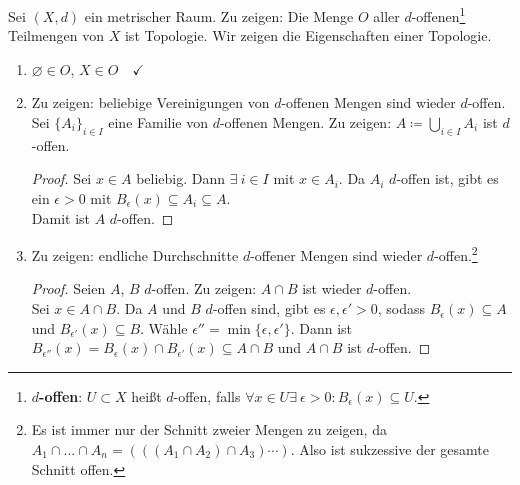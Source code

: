 \begin{problem}[1]
  Sei \( (X, d) \) ein metrischer Raum. Zu zeigen: Die Menge \( O \) aller \( d \)-offenen\footnote{\textbf{ \( d \)-offen}: \( U \subset X \) heißt \( d \)-offen, falls \( \forall x \in U \exists \ \epsilon > 0 : B_\epsilon(x) \subseteq U \).} Teilmengen von \( X \) ist Topologie. Wir zeigen die Eigenschaften einer Topologie.
  \begin{enumerate}
    \item \( \varnothing \in O \), \( X \in O \quad \checkmark \)
    \item Zu zeigen: beliebige Vereinigungen von \( d \)-offenen Mengen sind wieder \( d \)-offen. \\
    Sei \( {\{ A_i \}}_{i \in I} \) eine Familie von \( d \)-offenen Mengen. Zu zeigen: \( A \coloneqq \bigcup_{i \in I}A_i \) ist \( d \)-offen.
    \begin{proof}
      Sei \( x \in A \) beliebig. Dann \( \exists \ i \in I \) mit \( x \in A_i \). Da \( A_i \) \( d \)-offen ist, gibt es ein \( \epsilon > 0 \) mit \( B_\epsilon(x) \subseteq A_i \subseteq A \). \\
      Damit ist \( A \) \( d \)-offen.
    \end{proof}
    
    \item Zu zeigen: endliche Durchschnitte \( d \)-offener Mengen sind wieder \( d \)-offen.\footnote{Es ist immer nur der Schnitt zweier Mengen zu zeigen, da \( A_1 \cap \dots \cap A_n = \left(\left(\left( A_1 \cap A_2 \right) \cap A_3 \right) \cdots \right) \). Also ist sukzessive der gesamte Schnitt offen.}
    \begin{proof}
      Seien \( A \), \( B \) \( d \)-offen. Zu zeigen: \( A \cap B \) ist wieder \( d \)-offen. \\
      Sei \( x \in A \cap B \). Da \( A \) und \( B \) \( d \)-offen sind, gibt es \( \epsilon, \epsilon' > 0 \), sodass \( B_\epsilon(x) \subseteq A \) und \( B_{\epsilon'}(x) \subseteq B \). Wähle \( \epsilon'' = \min \{ \epsilon, \epsilon' \} \). Dann ist \( B_{\epsilon''}(x) = B_\epsilon(x) \cap B_{\epsilon'}(x) \subseteq A \cap B \) und \( A \cap B \) ist \( d \)-offen.
    \end{proof}
  \end{enumerate}
\end{problem}


